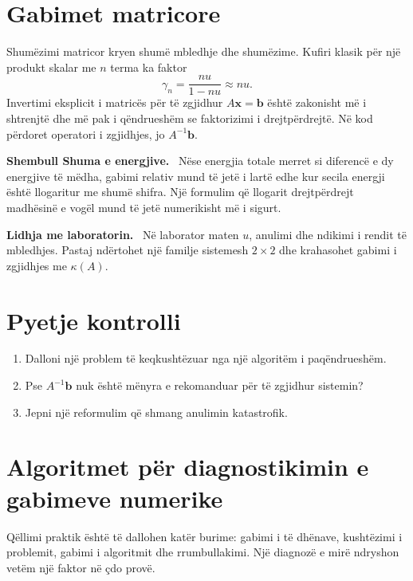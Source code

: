 \documentclass[11pt,oneside,openany]{book}
\newcommand{\vect}[1]{\bm{#1}}
\newenvironment{shembull}[1][]{\par\medskip\noindent\textbf{Shembull #1.}\ }{\par\medskip}
\newenvironment{lidhje}{\par\medskip\noindent\textbf{Lidhja me laboratorin.}\ }{\par\medskip}
\begin{document}
\section{Gabimet matricore}
Shumëzimi matricor kryen shumë mbledhje dhe shumëzime. Kufiri klasik për një produkt skalar me $n$ terma ka faktor
\begin{equation}
 \gamma_n=\frac{nu}{1-nu}\approx nu.
\end{equation}
Invertimi eksplicit i matricës për të zgjidhur $A\vect x=\vect b$ është zakonisht më i shtrenjtë dhe më pak i qëndrueshëm se faktorizimi i drejtpërdrejtë. Në kod përdoret operatori i zgjidhjes, jo $A^{-1}\vect b$.

\begin{shembull}[Shuma e energjive]
Nëse energjia totale merret si diferencë e dy energjive të mëdha, gabimi relativ mund të jetë i lartë edhe kur secila energji është llogaritur me shumë shifra. Një formulim që llogarit drejtpërdrejt madhësinë e vogël mund të jetë numerikisht më i sigurt.
\end{shembull}

\begin{lidhje}
Në laborator maten $u$, anulimi dhe ndikimi i rendit të mbledhjes. Pastaj ndërtohet një familje sistemesh $2\times2$ dhe krahasohet gabimi i zgjidhjes me $\kappa(A)$.
\end{lidhje}

\section*{Pyetje kontrolli}
\begin{enumerate}
\item Dalloni një problem të keqkushtëzuar nga një algoritëm i paqëndrueshëm.
\item Pse $A^{-1}\vect b$ nuk është mënyra e rekomanduar për të zgjidhur sistemin?
\item Jepni një reformulim që shmang anulimin katastrofik.
\end{enumerate}

\section{Algoritmet për diagnostikimin e gabimeve numerike}
Qëllimi praktik është të dallohen katër burime: gabimi i të dhënave, kushtëzimi i problemit, gabimi i algoritmit dhe rrumbullakimi. Një diagnozë e mirë ndryshon vetëm një faktor në çdo provë.
\end{document}
